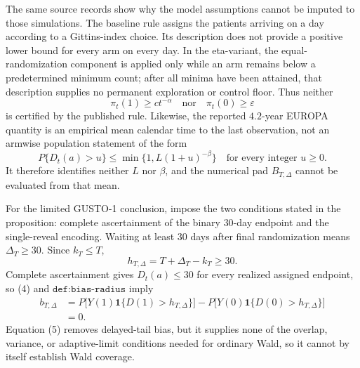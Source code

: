 The same source records show why the model assumptions cannot be imputed to those simulations.  The baseline rule assigns the patients arriving on a day according to a Gittins-index choice.  Its description does not provide a positive lower bound for every arm on every day.  In the eta-variant, the equal-randomization component is applied only while an arm remains below a predetermined minimum count; after all minima have been attained, that description supplies no permanent exploration or control floor.  Thus neither
\[
 \pi_t(1)\geq ct^{-\alpha}
 \quad\text{nor}\quad
 \pi_t(0)\geq\varepsilon
 \tag{2}
\]
is certified by the published rule.  Likewise, the reported \(4.2\)-year EUROPA quantity is an empirical mean calendar time to the last observation, not an armwise population statement of the form
\[
 P\{D_t(a)>u\}\leq\min\{1,L(1+u)^{-\beta}\}
 \quad\text{for every integer }u\geq0.
 \tag{3}
\]
It therefore identifies neither \(L\) nor \(\beta\), and the numerical pad \(B_{T,\Delta}\) cannot be evaluated from that mean.

For the limited GUSTO-1 conclusion, impose the two conditions stated in the proposition: complete ascertainment of the binary \(30\)-day endpoint and the single-reveal encoding.  Waiting at least \(30\) days after final randomization means \(\Delta_T\geq30\).  Since \(k_T\leq T\),
\[
 h_{T,\Delta}=T+\Delta_T-k_T\geq30.
 \tag{4}
\]
Complete ascertainment gives \(D_t(a)\leq30\) for every realized assigned endpoint, so (4) and \(\texttt{def:bias-radius}\) imply
\[
 \begin{aligned}
 b_{T,\Delta}
 &=P\bigl[Y(1)\mathbf 1\{D(1)>h_{T,\Delta}\}\bigr]
   -P\bigl[Y(0)\mathbf 1\{D(0)>h_{T,\Delta}\}\bigr]\\
 &=0.
 \end{aligned}
 \tag{5}
\]
Equation (5) removes delayed-tail bias, but it supplies none of the overlap, variance, or adaptive-limit conditions needed for ordinary Wald, so it cannot by itself establish Wald coverage.

